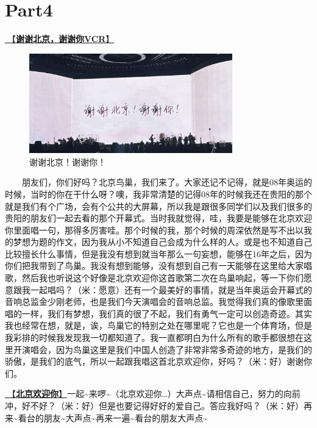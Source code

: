 \documentclass[]{ctexbook}
\begin{document}
\section{Part4}\label{beijing-20240921-part4}

\hyperref[thank-you-vcr]{🎥【\textbf{谢谢北京，谢谢你VCR}】}

\begin{figure}

{\centering \includegraphics[width=250pt]{img/beijing20240921/thank-beijing} 

}

\caption{谢谢北京！谢谢你！}\label{fig:unnamed-chunk-91}
\end{figure}

  朋友们，你们好吗？北京鸟巢，我们来了。大家还记不记得，就是08年奥运的时候，当时的你在干什么呀？噢，我非常清楚的记得08年的时候我还在贵阳的那个就是我们有个广场，会有个公共的大屏幕，所以我是跟很多同学们以及我们很多的贵阳的朋友们一起去看的那个开幕式。当时我就觉得，哇，我要是能够在北京欢迎你里面唱一句，那得多厉害哇。那个时候的我，那个时候的周深依然是写不出以我的梦想为题的作文，因为我从小不知道自己会成为什么样的人。或是也不知道自己比较擅长什么事情，但是我没有想到就当年那么一句妄想，能够在16年之后，因为你们把我带到了鸟巢。我没有想到能够，没有想到自己有一天能够在这里给大家唱歌，然后我也听说这个好像是北京欢迎你这首歌第二次在鸟巢响起，等一下你们愿意跟我一起唱吗？（米：愿意）还有一个最美好的事情，就是当年奥运会开幕式的音响总监金少刚老师，也是我们今天演唱会的音响总监。我觉得我们真的像歌里面唱的一样，我们有梦想，我们真的很了不起，我们有勇气一定可以创造奇迹。其实我也经常在想，就是，诶，鸟巢它的特别之处在哪里呢？它也是一个体育场，但是我彩排的时候我发现我一切都知道了。我一直都明白为什么所有的歌手都很想在这里开演唱会，因为鸟巢这里是我们中国人创造了非常非常多奇迹的地方，是我们的骄傲，是我们的底气，所以一起跟我唱这首北京欢迎你，好吗？（米：好）谢谢你们。

\hyperref[welcome-to-beijing]{🎵【\textbf{北京欢迎你}】}一起\textasciitilde 来啰\textasciitilde（北京欢迎你\ldots）大声点\textasciitilde 请相信自己，努力的向前冲，好不好？（米：好）但是也要记得好好的爱自己。答应我好吗？（米：好）再来\textasciitilde 看台的朋友\textasciitilde 大声点\textasciitilde 再来一遍\textasciitilde 看台的朋友大声点\textasciitilde{}
\end{document}

